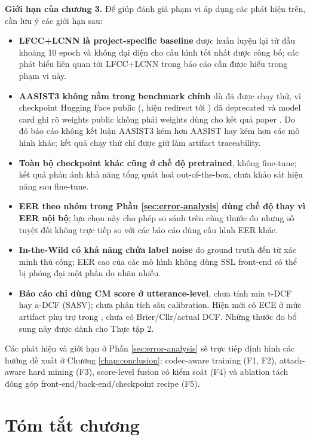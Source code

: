 \textbf{Giới hạn của chương 3.} Để giúp đánh giá phạm vi áp dụng các phát hiện trên, cần lưu ý các giới hạn sau:
\begin{itemize}
    \item \textbf{LFCC+LCNN là project-specific baseline} được huấn luyện lại từ đầu khoảng 10 epoch và không đại diện cho cấu hình tốt nhất được công bố; các phát biểu liên quan tới LFCC+LCNN trong báo cáo cần được hiểu trong phạm vi này.
    \item \textbf{AASIST3 không nằm trong benchmark chính} dù đã được chạy thử, vì checkpoint Hugging Face public (, hiện redirect tới ) đã deprecated và model card ghi rõ weights public không phải weights dùng cho kết quả paper \cite{aasist3_hf}. Do đó báo cáo không kết luận AASIST3 kém hơn AASIST hay kém hơn các mô hình khác; kết quả chạy thử chỉ được giữ làm artifact traceability.
    \item \textbf{Toàn bộ checkpoint khác cũng ở chế độ pretrained}, không fine-tune; kết quả phản ánh khả năng tổng quát hoá out-of-the-box, chưa khảo sát hiệu năng sau fine-tune.
    \item \textbf{EER theo nhóm trong Phần \ref{sec:error-analysis} dùng chế độ}  \textbf{thay vì EER nội bộ}; lựa chọn này cho phép so sánh trên cùng thước đo nhưng số tuyệt đối không trực tiếp so với các báo cáo dùng cấu hình EER khác.
    \item \textbf{In-the-Wild có khả năng chứa label noise} do ground truth đến từ xác minh thủ công; EER cao của các mô hình không dùng SSL front-end có thể bị phóng đại một phần do nhãn nhiễu.
    \item \textbf{Báo cáo chỉ dùng CM score ở utterance-level}, chưa tính min t-DCF hay a-DCF (SASV); chưa phân tích sâu calibration. Hiện mới có ECE ở mức artifact phụ trợ trong , chưa có Brier/Cllr/actual DCF. Những thước đo bổ sung này được dành cho Thực tập 2.
\end{itemize}

Các phát hiện và giới hạn ở Phần \ref{sec:error-analysis} sẽ trực tiếp định hình các hướng đề xuất ở Chương \ref{chap:conclusion}: codec-aware training (F1, F2), attack-aware hard mining (F3), score-level fusion có kiểm soát (F4) và ablation tách đóng góp front-end/back-end/checkpoint recipe (F5).

\section{Tóm tắt chương}


